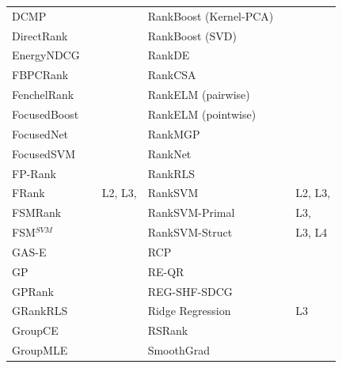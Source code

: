 \documentclass{sig-alternate}
\begin{document}
\begin{table}[!hpt]
{\begin{tabular}{lll|lll}
DCMP & \cite{Renjifo2012}  & \cite{Renjifo2012}  & RankBoost (Kernel-PCA) & \cite{Duh2008} & \cite{Duh2008, Sato2013} \\
DirectRank & \cite{Tan2013} & \cite{Tan2013} & RankBoost (SVD) & \cite{Lin2009} & \cite{Lin2009} \\
EnergyNDCG & \cite{Freno2011} & \cite{Freno2011} & RankDE & \cite{Bollegala2011} & \cite{Sato2013} \\
FBPCRank & \cite{Lai2011} & \cite{Lai2011} & RankCSA & \cite{He2010} & \cite{He2010} \\
FenchelRank & \cite{Lai2013} & \cite{Lai2013, Lai2013b, Laporte2013} & RankELM (pairwise) & \cite{Zong2013} & \cite{Zong2013} \\ 
FocusedBoost & \cite{Niu2012} & \cite{Niu2012} &  RankELM (pointwise) & \cite{Zong2013} & \cite{Zong2013} \\ 
FocusedNet & \cite{Niu2012} & \cite{Niu2012} & RankMGP & \cite{Lin2012} & \cite{Lin2012} \\ 
FocusedSVM & \cite{Niu2012} & \cite{Niu2012} & RankNet & \cite{Burges2005} & \cite{Busa-Fekete2013, Papini2012, Niu2012} \\ 
FP-Rank & \cite{Song2013} & \cite{Song2013} & RankRLS & \cite{Pahikkala2009} & \cite{Pahikkala2010} \\ 
FRank & \cite{Tsai2007} & L2, L3, \cite{Wang2012} & RankSVM & \cite{Herbrich1999, Joachims2002} & L2, L3, \cite{Busa-Fekete2013, Freno2011, He2010, Alcantara2010} \\ 
FSMRank & \cite{Lai2013c} & \cite{Lai2013c,Laporte2013} & RankSVM-Primal &  & L3, \cite{Lai2011} \\ 
FSM$^{SVM}$ & \cite{Lai2013c} & \cite{Lai2013c} & RankSVM-Struct &  & L3, L4 \\
GAS-E & \cite{Geng2007} & \cite{Lai2013c} & RCP & \cite{Elsas2008} & \cite{Elsas2008} \\ 
GP & \cite{DeAlmeida2007} & \cite{Alcantara2010} & RE-QR & \cite{Veloso2010} & \cite{Veloso2010} \\
GPRank & \cite{Silva2009} & \cite{Torkestani2012} & REG-SHF-SDCG & \cite{Wu2009} & \cite{Wu2009} \\  
GRankRLS & \cite{Pahikkala2010} & \cite{Pahikkala2010} & Ridge Regression & \cite{Cossock2006} & L3 \\
GroupCE & \cite{Lin2011} & \cite{Lin2011} & RSRank & \cite{Sun2009} & \cite{Lai2013} \\ 
GroupMLE & \cite{Lin2010} & \cite{Lin2011} & SmoothGrad & \cite{Le2007} & \cite{Tan2013} \\ 

\end{tabular}}
\end{table}
\end{document}
